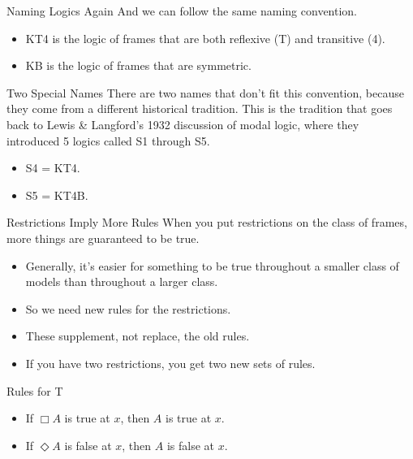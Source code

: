 \documentclass[
  ignorenonframetext,
]{beamer}
\providecommand{\tightlist}{%
  \setlength{\itemsep}{0pt}\setlength{\parskip}{0pt}}
\renewcommand{\,}{\text{, }}
\begin{document}
\begin{frame}{Naming Logics Again}
\protect\hypertarget{naming-logics-again}{}
And we can follow the same naming convention.

\begin{itemize}
\tightlist
\item
  KT4 is the logic of frames that are both reflexive (T) and transitive
  (4).
\item
  KB is the logic of frames that are symmetric.
\end{itemize}
\end{frame}

\begin{frame}{Two Special Names}
\protect\hypertarget{two-special-names}{}
There are two names that don't fit this convention, because they come
from a different historical tradition. This is the tradition that goes
back to Lewis \& Langford's 1932 discussion of modal logic, where they
introduced 5 logics called S1 through S5.

\begin{itemize}
\tightlist
\item
  S4 = KT4.
\item
  S5 = KT4B.
\end{itemize}
\end{frame}

\begin{frame}{Restrictions Imply More Rules}
\protect\hypertarget{restrictions-imply-more-rules}{}
When you put restrictions on the class of frames, more things are
guaranteed to be true.

\begin{itemize}
\tightlist
\item
  Generally, it's easier for something to be true throughout a smaller
  class of models than throughout a larger class.
\item
  So we need new rules for the restrictions.
\item
  These supplement, not replace, the old rules.
\item
  If you have two restrictions, you get two new sets of rules.
\end{itemize}
\end{frame}

\begin{frame}{Rules for T}
\protect\hypertarget{rules-for-t}{}
\begin{itemize}
\tightlist
\item
  If \(\Box A\) is true at \(x\), then \(A\) is true at \(x\).
\item
  If \(\Diamond A\) is false at \(x\), then \(A\) is false at \(x\).
\end{itemize}
\end{frame}
\end{document}
